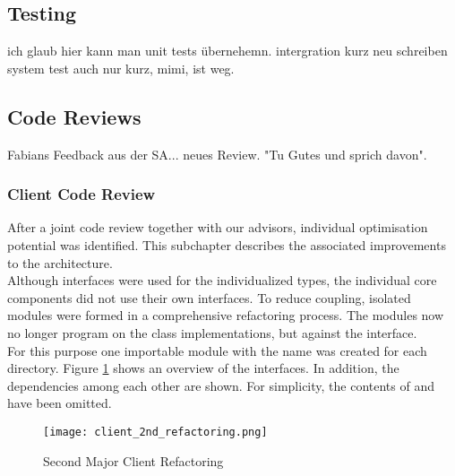 \subsection{Testing}
ich glaub hier kann man unit tests übernehemn.
intergration kurz neu schreiben
system test auch nur kurz, mimi, ist weg.


\subsection{Code Reviews}
Fabians Feedback aus der SA... neues Review. "Tu Gutes und sprich davon".

\subsubsection{Client Code Review}
After a joint code review together with our advisors, individual optimisation potential was identified.
This subchapter describes the associated improvements to the architecture. \\

Although interfaces were used for the individualized types,
the individual core components did not use their own interfaces.
To reduce coupling, isolated modules were formed in a comprehensive refactoring process.
The modules now no longer program on the class implementations, but against the interface. \\

For this purpose one importable module with the name  was created for each directory.
Figure \ref{fig:client_2nd_refactoring} shows an overview of the interfaces.
In addition, the dependencies among each other are shown.
For simplicity, the contents of  and  have been omitted. \\

\begin{figure}[H]
    \centering
    \texttt{[image: client\_2nd\_refactoring.png]}
    \caption{Second Major Client Refactoring}
    \label{fig:client_2nd_refactoring}
\end{figure}

